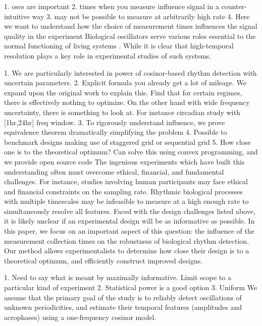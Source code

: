 1. oscs are important
2. times when you measure influence signal in a counter-intuitive way
3. may not be possible to measure at arbitrarily high rate
4. Here we want to understand how the choice of measurement times influences the signal quality in the experiment
Biological oscillators serve various roles essential to the normal functioning of living systems \cite{goldbeter1997biochemical}. While it is clear that high-temporal resolution plays a key role in experimental studies of such systems. 

1. We are particularly interested in power of  cosinor-based rhythm detection with uncertain parameters.
2. Explicit formula you already get a lot of mileage. We expand upon the original work to explain this. Find that for certain regimes, there is effectively nothing to optimize. On the other hand with wide frequency uncertainty, there is something to look at. For instance circadian study with [1hr,24hr] freq window. 
3. To rigorously understand influence, we prove equivalence theorem dramatically simplifying the problem
4. Possible to benchmark designs making use of staggered grid or sequential grid
5. How close one is to the theoretical optimum? Can solve this using convex programming, and we provide open source code
The ingenious experiments which have built this understanding often must overcome ethical, financial, and fundamental challenges. For instance, studies involving human participants may face ethical and financial constraints on the sampling rate. Rhythmic biological processes with multiple timescales may be infeasible to measure at a high enough rate to simultaneously resolve all features. Faced with the design challenges listed above, it is likely unclear if an experimental design will be as informative as possible. In this paper, we focus on an important aspect of this question: the influence of the measurement collection times on the robustness of biological rhythm detection. Our method allows experimentalists to determine how close their design is to a theoretical optimum, and efficiently construct improved designs. 



1. Need to say what is meant by maximally informative. Limit scope to a particular kind of experiment
2. Statistical power is a good option
3. Uniform 
We assume that the primary goal of the study is to reliably detect oscillations of unknown periodicities, and estimate their temporal features (amplitudes and acrophases) using a one-frequency cosinor model. 



